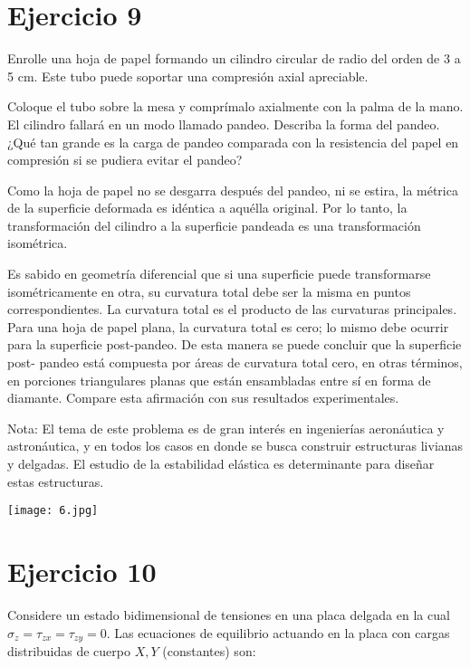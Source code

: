 \documentclass[a4paper,12pt,twoside,final,spanish]{article}
\begin{document}
\section*{Ejercicio 9}

Enrolle una hoja de papel formando un cilindro circular de radio del orden de 3 a 5 cm. Este tubo puede soportar una compresión axial apreciable.

Coloque el tubo sobre la mesa y comprímalo axialmente con la palma de la mano. El 
cilindro fallará en un modo llamado pandeo. Describa la forma del pandeo. ¿Qué tan 
grande es la carga de pandeo comparada con la resistencia del papel en compresión si 
se pudiera evitar el pandeo?

Como la hoja de papel no se desgarra después del pandeo, ni se estira, la métrica de la superficie deformada es idéntica a aquélla original. Por lo tanto, la transformación del cilindro a la superficie pandeada es una transformación isométrica. 

Es sabido en geometría diferencial que si una superficie puede transformarse isométricamente en otra, su curvatura total debe ser la misma en puntos correspondientes. La curvatura total es el producto de las curvaturas principales. Para una hoja de papel plana, la curvatura total es cero; lo mismo debe ocurrir para la superficie post-pandeo. De esta manera se puede concluir que la superficie post-
pandeo está compuesta por áreas de curvatura total cero, en otras términos, en porciones triangulares planas que están ensambladas entre sí en forma de diamante. 
Compare esta afirmación con sus resultados experimentales.

Nota: El tema de este problema es de gran interés en ingenierías aeronáutica y astronáutica, y en todos los casos en donde se busca construir estructuras livianas y 
delgadas. El estudio de la estabilidad elástica es determinante para diseñar estas estructuras.  

\dotfill

\begin{center}
\texttt{[image: 6.jpg]}
\end{center}

\section*{Ejercicio 10}

Considere un estado bidimensional de tensiones en una placa delgada en la cual $\sigma_{z}=\tau_{zx}=\tau_{zy}=0$. Las ecuaciones de equilibrio actuando en la placa con cargas distribuidas de cuerpo $X,Y$ (constantes) son:
\end{document}
